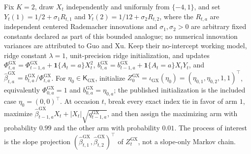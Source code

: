 Fix \(K=2\), draw \(X_t\) independently and uniformly from \(\{-4,1\}\), and set \(Y_t(1)=1/2+\sigma_1R_{t,1}\) and \(Y_t(2)=1/12+\sigma_2R_{t,2}\), where the \(R_{t,a}\) are independent centered Rademacher innovations and \(\sigma_1,\sigma_2>0\) are arbitrary fixed constants declared as part of this bounded analogue; no numerical innovation variances are attributed to Guo and Xu. Keep their no-intercept working model, ridge constant \(\lambda=1\), unit-precision ridge initialization, and updates \(\Phi^{\mathrm{GX}}_{t,a}=\Phi^{\mathrm{GX}}_{t-1,a}+\mathbf 1\{A_t=a\}X_t^2\), \(b^{\mathrm{GX}}_{t,a}=b^{\mathrm{GX}}_{t-1,a}+\mathbf 1\{A_t=a\}X_tY_t\), and \(\widehat\beta^{\mathrm{GX}}_{t,a}=b^{\mathrm{GX}}_{t,a}/\Phi^{\mathrm{GX}}_{t,a}\). For \(\eta_0\in\mathsf K_{\mathrm{GX}}\), initialize \(Z^{\mathrm{GX}}_0=\iota_{\mathrm{GX}}(\eta_0)=(\eta_{0,1},\eta_{0,2},1,1)^\top\), equivalently \(\Phi^{\mathrm{GX}}_{0,a}=1\) and \(b^{\mathrm{GX}}_{0,a}=\eta_{0,a}\); the published initialization is the included case \(\eta_0=(0,0)^\top\). At occasion \(t\), break every exact index tie in favor of arm \(1\), maximize \(\widehat\beta^{\mathrm{GX}}_{t-1,a}X_t+|X_t|\sqrt{q^{\mathrm{GX}}_{t-1,a}}\), and then assign the maximizing arm with probability \(0.99\) and the other arm with probability \(0.01\). The process of interest is the slope projection \((\widehat\beta^{\mathrm{GX}}_{t,1},\widehat\beta^{\mathrm{GX}}_{t,2})^\top\) of \(Z^{\mathrm{GX}}_t\), not a slope-only Markov chain.